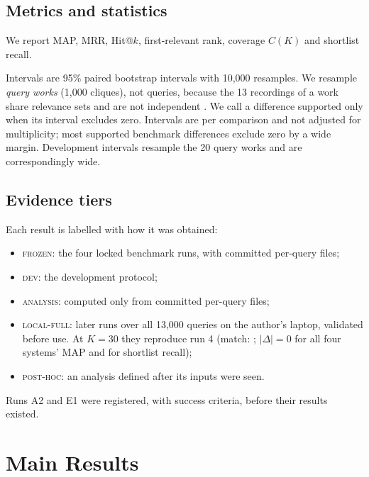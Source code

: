 \documentclass[10pt]{article}
\newcommand{\tier}[1]{\textsc{#1}}
\begin{document}


\subsection{Metrics and statistics}
We report MAP, MRR, Hit@$k$, first-relevant rank, coverage $C(K)$ and shortlist recall.

Intervals are 95\% paired bootstrap intervals with 10{,}000 resamples. We resample \emph{query works} (1{,}000 cliques), not queries, because the 13 recordings of a work share relevance sets and are not independent \citep{efron1993,field2007}.
We call a difference supported only when its interval excludes zero. Intervals are per comparison and not adjusted for multiplicity; most supported benchmark differences exclude zero by a wide margin. Development intervals resample the 20 query works and are correspondingly wide.

\subsection{Evidence tiers}
Each result is labelled with how it was obtained:
\begin{itemize}
\item \tier{frozen}: the four locked benchmark runs, with committed per-query files;
\item \tier{dev}: the development protocol;
\item \tier{analysis}: computed only from committed per-query files;
\item \tier{local-full}: later runs over all 13{,}000 queries on the author's laptop, validated before use. At $K=30$ they reproduce run 4 (match: \ReproPass; $|\Delta|=0$ for all four systems' MAP and for shortlist recall);
\item \tier{post-hoc}: an analysis defined after its inputs were seen.
\end{itemize}
Runs A2 and E1 were registered, with success criteria, before their results existed.

\section{Main Results}\label{sec:results}
\end{document}
